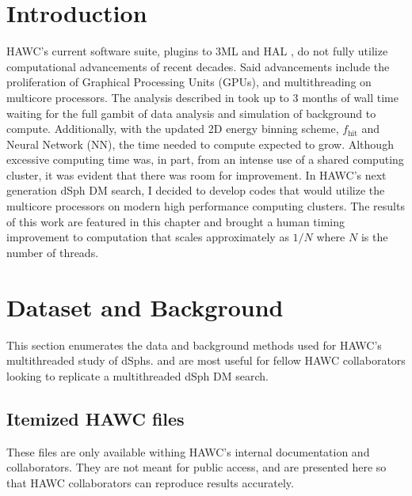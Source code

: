 \section{Introduction}\label{sec:mtd_intro}

HAWC's current software suite, plugins to 3ML and HAL \cite{2021arXiv211201818M,Abeysekara_2017}, do not fully utilize computational advancements of recent decades.
Said advancements include the proliferation of Graphical Processing Units (GPUs), and multithreading on multicore processors.
The analysis described in  took up to 3 months of wall time waiting for the full gambit of data analysis and simulation of background to compute.
Additionally, with the updated 2D energy binning scheme, $f_\mathrm{hit}$ and Neural Network (NN), the time needed to compute expected to grow.
Although excessive computing time was, in part, from an intense use of a shared computing cluster, it was evident that there was room for improvement.
In HAWC's next generation dSph DM search, I decided to develop codes that would utilize the multicore processors on modern high performance computing clusters.
The results of this work are featured in this chapter and brought a human timing improvement to computation that scales approximately as $1/N$ where $N$ is the number of threads.

\section{Dataset and Background}\label{sec:mtd_databgd}

This section enumerates the data and background methods used for HAWC's multithreaded study of dSphs.
 and  are most useful for fellow HAWC collaborators looking to replicate a multithreaded dSph DM search.

\subsection{Itemized HAWC files}\label{sec:mtd_data}
These files are only available withing HAWC's internal documentation and collaborators.
They are not meant for public access, and are presented here so that HAWC collaborators can reproduce results accurately.


